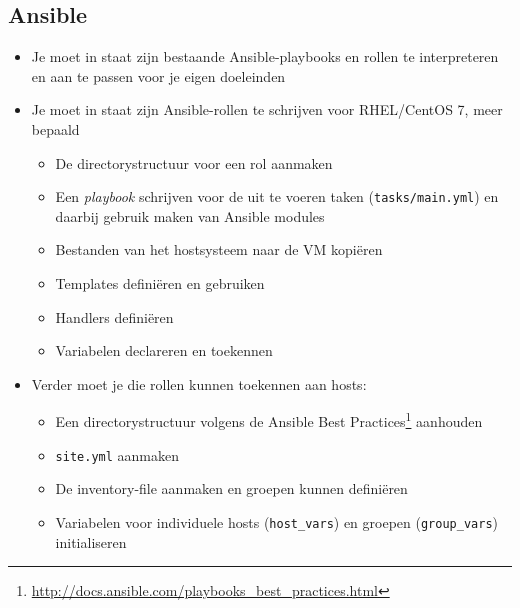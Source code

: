 \subsection{Ansible}
\label{subs:ansible}

\begin{itemize}
\item Je moet in staat zijn bestaande Ansible-playbooks en rollen te interpreteren en aan te passen voor je eigen doeleinden
\item Je moet in staat zijn Ansible-rollen te schrijven voor RHEL/CentOS 7, meer bepaald

  \begin{itemize}
  \item De directorystructuur voor een rol aanmaken
  \item Een \emph{playbook} schrijven voor de uit te voeren taken (\texttt{tasks/main.yml}) en daarbij gebruik maken van Ansible modules
  \item Bestanden van het hostsysteem naar de VM kopiëren
  \item Templates definiëren en gebruiken
  \item Handlers definiëren
  \item Variabelen declareren en toekennen
  \end{itemize}

\item Verder moet je die rollen kunnen toekennen aan hosts:

  \begin{itemize}
    \item Een directorystructuur volgens de Ansible Best Practices\footnote{\url{http://docs.ansible.com/playbooks_best_practices.html}} aanhouden
  \item \texttt{site.yml} aanmaken
  \item De inventory-file aanmaken en groepen kunnen definiëren
  \item Variabelen voor individuele hosts (\texttt{host\_vars}) en groepen (\texttt{group\_vars}) initialiseren
  \end{itemize}
\end{itemize}
